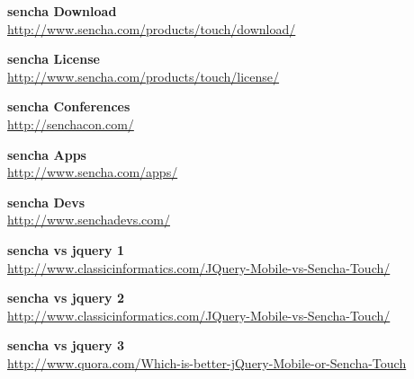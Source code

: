 \documentclass[a4paper,12pt]{book}
\begin{document}
\begin{thebibliography}{25}
\textbf{sencha Download}\\
{\footnotesize\url{http://www.sencha.com/products/touch/download/}}

\textbf{sencha License}\\
{\footnotesize\url{http://www.sencha.com/products/touch/license/}}

\textbf{sencha Conferences}\\
{\footnotesize\url{http://senchacon.com/}}

\textbf{sencha Apps}\\
{\footnotesize\url{http://www.sencha.com/apps/}}

\textbf{sencha Devs}\\
{\footnotesize\url{http://www.senchadevs.com/}}

\textbf{sencha vs jquery 1}\\
{\footnotesize\url{http://www.classicinformatics.com/JQuery-Mobile-vs-Sencha-Touch/}}

\textbf{sencha vs jquery 2}\\
{\footnotesize\url{http://www.classicinformatics.com/JQuery-Mobile-vs-Sencha-Touch/}}

\textbf{sencha vs jquery 3}\\
{\footnotesize\url{http://www.quora.com/Which-is-better-jQuery-Mobile-or-Sencha-Touch}}


\end{thebibliography}
\end{document}
